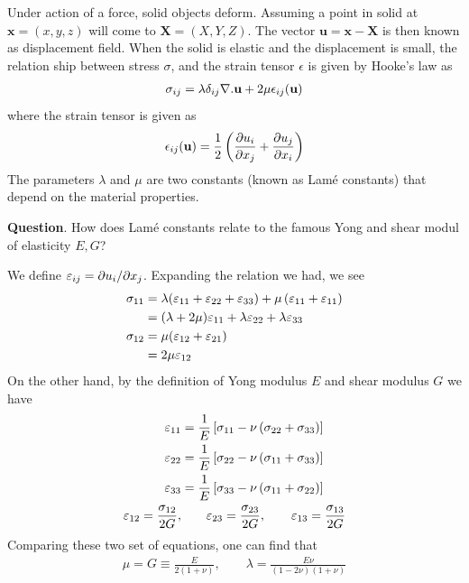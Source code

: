 Under action of a force, solid objects deform. Assuming a point in
solid at $\mathbf{x} = (x,y,z)$ will come to $\mathbf{X} =
(X,Y,Z)$. The vector $\mathbf{u} = \mathbf{x}- \mathbf{X}$ is then
known as displacement field. When the solid is elastic and the
displacement is small, the relation ship between stress $\sigma$, and
the strain tensor $\epsilon$ is given by Hooke's law as
%
\begin{align}
  \sigma_{ij} = \lambda \delta _{ij} \nabla . \mathbf{u} + 2\mu \epsilon _{ij} (\mathbf{u}) 
\end{align}
%
where the strain tensor is given as
%
\begin{align}
  \epsilon_{ij} (\mathbf{u}) = \frac{1}{2} \left( \frac{\partial u_{i}}{\partial x_{j}} + \frac{\partial u_{j}}{\partial x_{i}} \right)
\end{align}
%
The parameters $\lambda$ and $\mu$ are two constants (known as Lam\'e constants) that depend on
the material properties. 


\textbf{Question}. How does Lam\'e constants relate to the famous
Yong and shear modul of elasticity $E, G$?

We define $\varepsilon_{ij} = \partial u_i/ \partial x_j$. Expanding the relation
we had, we see
%
\begin{align}
  \sigma_{11} & = \lambda (\varepsilon_{11} + \varepsilon_{22} + \varepsilon_{33}) + \mu \left( \varepsilon_{11} + \varepsilon_{11}\right) \nonumber\\
             & = ( \lambda + 2\mu )\varepsilon_{11}  + \lambda \varepsilon_{22} + \lambda \varepsilon_{33} \\
  \sigma_{12} & =  \mu ( \varepsilon _{12} + \varepsilon _{21}) \nonumber\\
             & = 2\mu \varepsilon_{12} 
\end{align}
%
On the other hand, by the definition of Yong modulus $E$ and shear
modulus $G$ we have
%
\begin{align}
  \varepsilon_{11} & = \frac{1}{E}  \left[ \sigma_{11} - \nu \left( \sigma_{22} + \sigma_{33}\right) \right] \\
  \varepsilon_{22} & = \frac{1}{E}  \left[ \sigma_{22} - \nu \left( \sigma_{11} + \sigma_{33}\right) \right] \\
  \varepsilon_{33} & = \frac{1}{E}  \left[ \sigma_{33} - \nu \left( \sigma_{11} + \sigma_{22}\right) \right] \\
  \varepsilon_{12} = \frac{\sigma_{12}}{2G}, & \qquad \varepsilon_{23} = \frac{\sigma_{23}}{2G},  \qquad \varepsilon_{13} = \frac{\sigma_{13}}{2G}
\end{align}
%
Comparing these two set of equations, one can find that
%
\begin{align}
 \mu = G \equiv \frac{E}{2(1+\nu)} , \qquad \lambda  = \frac{E\nu}{(1-2\nu)(1+\nu)} 
\end{align}
%
